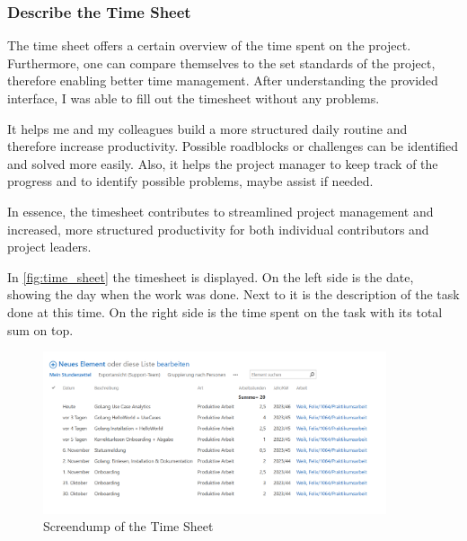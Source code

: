 \subsubsection*{Describe the Time Sheet}
The time sheet offers a certain overview of the time spent on the project. 
Furthermore, one can compare themselves to the set standards of the project, therefore enabling better time management.
After understanding the provided interface, I was able to fill out the timesheet without any problems.

It helps me and my colleagues build a more structured daily routine and therefore increase productivity. Possible roadblocks or challenges can be identified and solved more easily.
Also, it helps the project manager to keep track of the progress and to identify possible problems, maybe assist if needed.

In essence, the timesheet contributes to streamlined project management and increased, more structured productivity for both individual contributors and project leaders.

In \autoref{fig:time_sheet} the timesheet is displayed.
On the left side is the date, showing the day when the work was done.
Next to it is the description of the task done at this time.
On the right side is the time spent on the task with its total sum on top.

\begin{figure}[h]
    \centering
    \includegraphics[width=0.9\textwidth]{figures/onboarding/stundenzettel_screendump.png}
    \caption{Screendump of the Time Sheet}
    \label{fig:time_sheet}
\end{figure}
